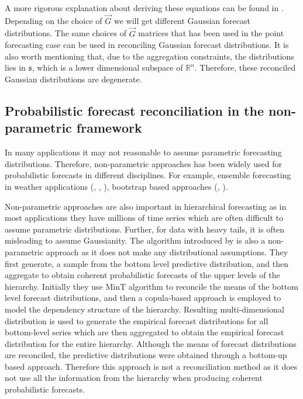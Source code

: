 \documentclass[graybox]{svmult}
\begin{document}
A more rigorous explanation about deriving these equations can be found in \cite{Gamakumara2018}. Depending on the choice of $\vec{G}$ we will get different Gaussian forecast distributions. The same choices of $\vec{G}$ matrices that has been used in the point forecasting case can be used in reconciling Gaussian forecast distributions. It is also worth mentioning that, due to the aggregation constraints, the distributions lies in $\mathfrak{s}$, which is a lower dimensional subspace of $\mathbb{R}^n$. Therefore, these reconciled Gaussian distributions are degenerate.


\subsection{Probabilistic forecast reconciliation in the non-parametric framework}

In many applications it may not reasonable to assume parametric forecasting distributions. Therefore, non-parametric approaches has been widely used for probabilistic forecasts in different disciplines. For example, ensemble forecasting in weather applications (\cite{Gneiting2005}, \cite{Gneiting2014}, \cite{Gneiting2008}), bootstrap based approaches (\cite{Manzan2008}, \cite{Vilar2013}).

Non-parametric approaches are also important in hierarchical forecasting as in most applications they have millions of time series which are often difficult to assume parametric distributions. Further, for data with heavy tails, it is often misleading to assume Gaussianity. The algorithm introduced by \cite{Taieb2017} is also a non-parametric approach as it does not make any distributional assumptions. They first generate, a sample from the bottom level predictive distribution, and then aggregate to obtain coherent probabilistic forecasts of the upper levels of the hierarchy. Initially they use MinT algorithm to reconcile the means of the bottom level forecast distributions, and then a copula-based approach is employed to model the dependency structure of the hierarchy. Resulting multi-dimensional distribution is used to generate the empirical forecast distributions for all bottom-level series which are then aggregated to obtain the empirical forecast distribution for the entire hierarchy. Although the means of forecast distributions are reconciled, the predictive distributions were obtained through a bottom-up based approach. Therefore this approach is not a reconciliation method as it does not use all the information from the hierarchy when producing coherent probabilistic forecasts.
\end{document}
